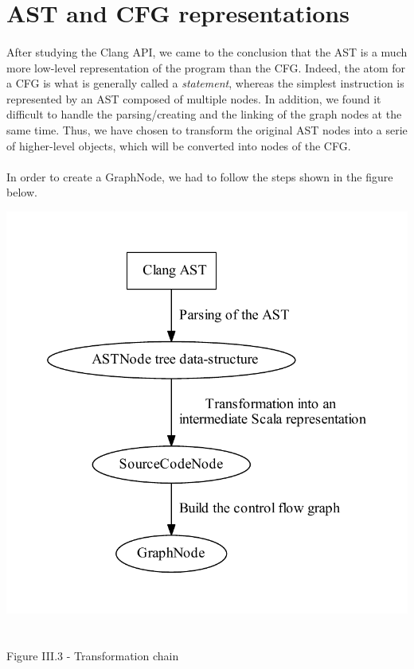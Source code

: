 \documentclass{report}
\begin{document}
\section{\textsc{AST} and \textsc{CFG} representations}

\paragraph{}
\hspace{4mm}After studying the Clang API, we came to the conclusion that the
 AST is a much more low-level representation of the program than
 the CFG. 
Indeed, the atom for a CFG is what is generally called a 
\textit{statement}, whereas the simplest instruction is represented by an AST 
composed of multiple nodes. In addition, we found it 
difficult to handle the parsing/creating and the linking of the graph nodes at 
the same time.
Thus, we have chosen to transform the original AST nodes into a serie of 
higher-level objects, which will be converted into nodes of the CFG.

\paragraph{}
\hspace{4mm}In order to create a GraphNode, we had to follow the steps shown 
in the figure below.

\begin{center}
\includegraphics[scale=0.65]{data/transform_chain}
~\\~\\Figure III.3 - Transformation chain
\end{center}
\end{document}
